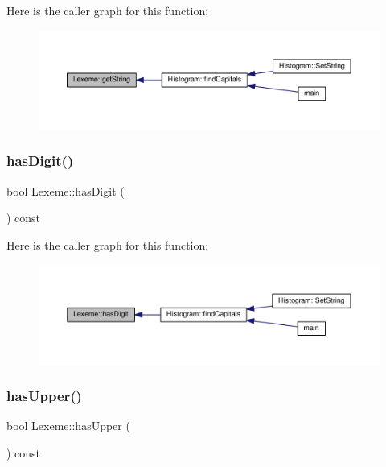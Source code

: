 Here is the caller graph for this function\+:
\nopagebreak
\begin{figure}[H]
\begin{center}
\leavevmode
\includegraphics[width=350pt]{class_lexeme_ac3bedb54fb40b5b7d85edb3cf2d715db_icgraph}
\end{center}
\end{figure}
\mbox{\label{class_lexeme_a01b2154c183663f7e298b564d14a907e}} 
\subsubsection{\texorpdfstring{has\+Digit()}{hasDigit()}}
{\footnotesize\ttfamily bool Lexeme\+::has\+Digit (\begin{DoxyParamCaption}{ }\end{DoxyParamCaption}) const\hspace{0.3cm}{\ttfamily [inline]}}

Here is the caller graph for this function\+:
\nopagebreak
\begin{figure}[H]
\begin{center}
\leavevmode
\includegraphics[width=350pt]{class_lexeme_a01b2154c183663f7e298b564d14a907e_icgraph}
\end{center}
\end{figure}
\mbox{\label{class_lexeme_a5b40ad2f0863cbae11b0dd2c7876d8e8}} 
\subsubsection{\texorpdfstring{has\+Upper()}{hasUpper()}}
{\footnotesize\ttfamily bool Lexeme\+::has\+Upper (\begin{DoxyParamCaption}{ }\end{DoxyParamCaption}) const\hspace{0.3cm}{\ttfamily [inline]}}

